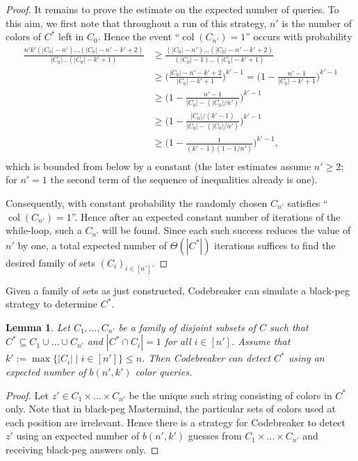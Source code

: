 \documentclass[english,a4paper,11pt]{article}
\DeclareMathOperator{\col}{col}
\newtheorem{lemma}[theorem]{Lemma}
\begin{document}
{\begin{proof}
It remains to prove the estimate on the expected number of queries. To this aim, we first note that throughout a run of this strategy, $n'$ is the number of colors of $C^*$ left in $C_0$. Hence the event ``$\col(C_{n'}) = 1$'' occurs with probability
\begin{align*}
\frac{n' k' (|C_0| - n')  \ldots (|C_0| - n' - k' + 2)}{|C_0| \ldots (|C_0| - k' + 1)} 
&\ge \frac{(|C_0| - n') \ldots (|C_0| - n' - k' + 2)}{(|C_0|-1) \ldots (|C_0| - k' + 1)} \\
& \ge \bigg( \frac{|C_0| - n' - k' + 2}{|C_0| - k' + 1} \bigg)^{k'-1} = \bigg( 1 - \frac{n' - 1}{|C_0| - k' + 1} \bigg)^{k'-1}\\
& \ge \bigg( 1 - \frac{n' - 1}{|C_0| - (|C_0|/n')} \bigg)^{k'-1}\\
& \ge \bigg( 1 - \frac{|C_0| / (k'-1)}{|C_0| - (|C_0|/n')} \bigg)^{k'-1}\\
& \ge \bigg( 1 - \frac{1}{(k'-1)(1 - 1/n')} \bigg)^{k'-1},\\
\end{align*}
which is bounded from below by a constant (the later estimates assume $n' \ge 2$; for $n'=1$ the second term of the sequence of inequalities already is one).

Consequently, with constant probability the randomly chosen $C_{n'}$ satisfies ``$\col(C_{n'}) = 1$''. Hence after an expected constant number of iterations of the while-loop, such a $C_{n'}$ will be found. Since each such success reduces the value of $n'$ by one, a total expected number of $\Theta(|C^*|)$ iterations suffices to find the desired family of sets $(C_i)_{i \in [n']}$.
\end{proof}

Given a family of sets as just constructed, Codebreaker can simulate a black-peg strategy to determine $C^*$.

\begin{lemma}\label{lemlast}
  Let $C_1, \ldots, C_{n'}$ be a family of disjoint subsets of $C$ such that $C^* \subseteq C_1 \cup \ldots \cup C_{n'}$ and $|C^* \cap C_i| = 1$ for all $i \in [n']$. Assume that $k' := \max\{|C_i| \mid i \in [n']\} \le n$. Then Codebreaker can detect $C^*$ using an expected number of $b(n', k')$ color queries.
\end{lemma}

\begin{proof}
  Let $z' \in C_1 \times \ldots \times C_{n'}$ be the unique such string consisting of colors in $C^*$ only. Note that in black-peg Mastermind, the particular sets of colors used at each position are irrelevant. Hence there is a strategy for Codebreaker to detect $z'$ using an expected number of $b(n',k')$ guesses from $C_1 \times \ldots \times C_{n'}$ and receiving black-peg answers only. 
  

\end{proof}}
\end{document}
